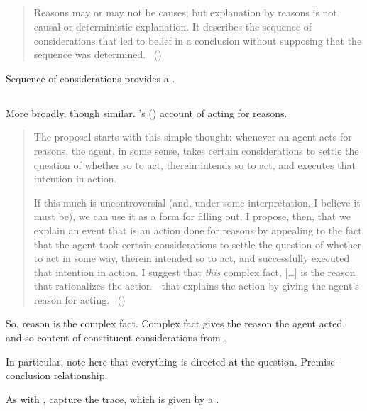 \subsection*{\textcite{Harman:1973ww}}

\begin{note}
  \begin{quote}
    Reasons may or may not be causes; but explanation by reasons is not causal or deterministic explanation.
    It describes the sequence of considerations that led to belief in a conclusion without supposing that the sequence was determined.%
    \mbox{ }\hfill\mbox{(\citeyear[52]{Harman:1973ww})}
  \end{quote}

  Sequence of considerations provides a \wit{}.
\end{note}

\subsection*{\textcite{Hieronymi:2011aa}}

\begin{note}
  More broadly, though similar.
  \citeauthor{Hieronymi:2011aa}'s (\citeyear{Hieronymi:2011aa}) account of acting for reasons.

  \begin{quote}
    The proposal starts with this simple thought: whenever an agent acts for reasons, the agent, in some sense, takes certain considerations to settle the question of whether so to act, therein intends so to act, and executes that intention in action.

    If this much is uncontroversial (and, under some interpretation, I believe it must be), we can use it as a form for filling out.
    I propose, then, that we explain an event that is an action done for reasons by appealing to the fact that the agent took certain considerations to settle the question of whether to act in some way, therein intended so to act, and successfully executed that intention in action.
    I suggest that \emph{this} complex fact, [\dots] is the reason that rationalizes the action---that explains the action by giving the agent's reason for acting.%
    \mbox{ }\hfill\mbox{(\citeyear[431]{Hieronymi:2011aa})}
  \end{quote}

  So, reason is the complex fact.
  Complex fact gives the reason the agent acted, and so content of constituent considerations from \agpe{}.

  In particular, note here that everything is directed at the question.
  Premise-conclusion relationship.

  As with \citeauthor{Harman:1973ww}, capture the trace, which is given by a \wit{}.
\end{note}

